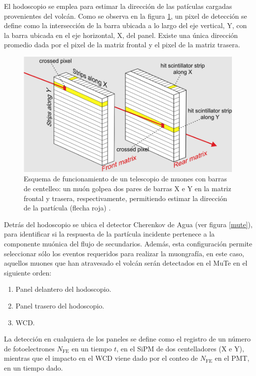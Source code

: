 \documentclass[12pt,oneside,openany,letter]{book}
\begin{document}
El hodoscopio se emplea para estimar la dirección de las pat\'iculas cargadas provenientes del volcán. Como se observa en la figura \ref{pixels}, un pixel de detección se define como la intersección de la barra ubicada a lo largo del eje vertical, Y, con la barra ubicada en el eje horizontal, X, del panel. Existe una única dirección promedio dada por el pixel de la matriz frontal y el pixel de la matriz trasera. 
\begin{figure}[h!]
    \centering        \includegraphics[scale=0.5]{pixels.png}
   \caption[Esquema de funcionamiento de un hodoscopio de muones con barras de centelleo]{Esquema de funcionamiento de un telescopio de muones con barras de centelleo: un muón golpea dos pares de barras X e Y en la matriz frontal y trasera, respectivamente, permitiendo estimar la dirección de la partícula (flecha roja) \cite{Carbone-etal2014}.}\label{pixels}
\end{figure}

Detrás del hodoscopio se ubica el detector Cherenkov de Agua (ver figura \ref{mute}), para identificar si la respuesta de la part\'icula incidente pertenece a la componente mu\'onica del flujo de secundarios. Además, esta configuraci\'on permite seleccionar s\'olo los eventos requeridos para realizar la muongraf\'ia, en este caso, aquellos muones que han atravesado el volc\'an ser\'an detectados en el MuTe en el siguiente orden:
\begin{enumerate}
\item Panel delantero del hodoscopio.
\item Panel trasero del hodoscopio.
\item WCD.
\end{enumerate}
La detecci\'on en cualquiera de los paneles se define como el registro de un número de fotoelectrones $N_\mathrm{FE}$ en un tiempo $t$, en el SiPM de dos centelladores (X e Y), mientras que el impacto en el WCD viene dado por el conteo de $N_\mathrm{FE}$ en el PMT, en un tiempo dado.
\end{document}
